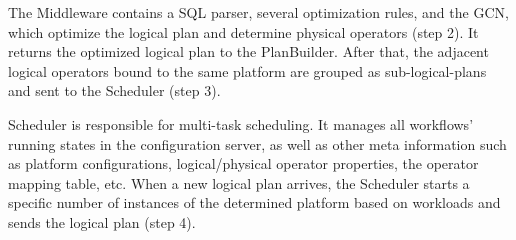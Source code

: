 The Middleware contains a SQL parser, several optimization rules, and the GCN, which optimize the logical plan and determine physical operators (step 2). It returns the optimized logical plan to the PlanBuilder. After that, the adjacent logical operators bound to the same platform are grouped as sub-logical-plans and sent to the Scheduler (step 3). 

Scheduler is responsible for multi-task scheduling. It manages all workflows’ running states in the configuration server, as well as other meta information such as platform configurations, logical/physical operator properties, the operator mapping table, etc. When a new logical plan arrives, the Scheduler starts a specific number of instances of the determined platform based on workloads and sends the logical plan (step 4). 
\fi



